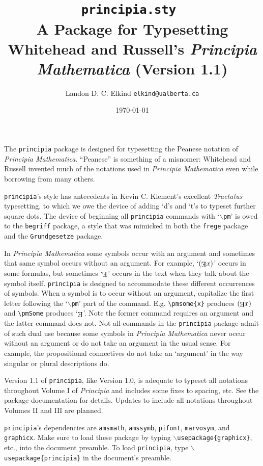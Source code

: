 \documentclass[12pt]{article}
\title{\texttt{principia.sty }\\ A \LaTeXe \space Package for Typesetting Whitehead and Russell's \textit{Principia Mathematica} (Version 1.1)}
\author{Landon D. C. Elkind \texttt{elkind@ualberta.ca}}
\date{\today}
\begin{document}
\maketitle
\onehalfspacing
The \texttt{principia} package is designed for typesetting the Peanese notation of \textit{Principia Mathematica}. ``Peanese'' is something of a misnomer: Whitehead and Russell invented much of the notations used in \textit{Principia Mathematica} even while borrowing from many others.

\texttt{principia}'s style has antecedents in Kevin C. Klement's excellent \textit{Tractatus} typesetting, to which we owe the device of adding `d's and `t's to typeset further square dots. The device of beginning all \texttt{principia} commands with `\texttt{$\backslash$pm}' is owed to the \texttt{begriff} package, a style that was mimicked in both the \texttt{frege} package and the \texttt{Grundgesetze} package. 

In \textit{Principia Mathematica} some symbols occur with an argument and sometimes that same symbol occurs without an argument. For example, `$\pmsome{x}$' occurs in some formulas, but sometimes `$\pmSome$' occurs in the text when they talk about the symbol itself. \texttt{principia} is designed to accommodate these different occurrences of symbols. When a symbol is to occur without an argument, capitalize the first letter following the `\texttt{$\backslash$pm}' part of the command. E.g. \verb|\pmsome{x}| produces $\pmsome{x}$ and \verb|\pmSome| produces `$\pmSome$'. Note the former command requires an argument and the latter command does not. Not all commands in the \texttt{principia} package admit of such dual use because some symbols in \textit{Principia Mathematica} never occur without an argument or do not take an argument in the usual sense. For example, the propositional connectives do not take an `argument' in the way singular or plural descriptions do.

Version 1.1 of \texttt{principia}, like Version 1.0, is adequate to typeset all notations throughout Volume I of \textit{Principia} and includes some fixes to spacing, etc. See the package documentation for details. Updates to include all notations throughout Volumes II and III are planned.

\texttt{principia}'s dependencies are \texttt{amsmath}, \texttt{amssymb}, \texttt{pifont}, \texttt{marvosym}, and \texttt{graphicx}. Make sure to load these package by typing \texttt{$\backslash$usepackage\{graphicx\}}, etc., into the document preamble. To load \texttt{principia}, type \texttt{$\backslash$usepackage\{principia\}} in the document's preamble.
\end{document}
